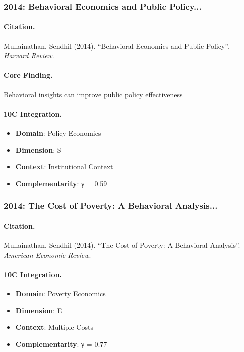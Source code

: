 \subsubsection{2014: Behavioral Economics and Public Policy...}

\paragraph{Citation.}
Mullainathan, Sendhil (2014). ``Behavioral Economics and Public Policy''. \textit{Harvard Review}.

\paragraph{Core Finding.}
Behavioral insights can improve public policy effectiveness

\paragraph{10C Integration.}
\begin{itemize}[nosep]
  \item \textbf{Domain}: Policy Economics
  \item \textbf{Dimension}: S
  \item \textbf{Context}: Institutional Context
  \item \textbf{Complementarity}: γ = 0.59
\end{itemize}


\subsubsection{2014: The Cost of Poverty: A Behavioral Analysis...}

\paragraph{Citation.}
Mullainathan, Sendhil (2014). ``The Cost of Poverty: A Behavioral Analysis''. \textit{American Economic Review}.

\paragraph{10C Integration.}
\begin{itemize}[nosep]
  \item \textbf{Domain}: Poverty Economics
  \item \textbf{Dimension}: E
  \item \textbf{Context}: Multiple Costs
  \item \textbf{Complementarity}: γ = 0.77
\end{itemize}


